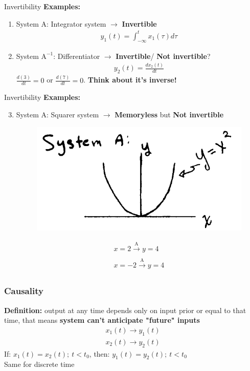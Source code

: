 \documentclass[pdflatex,compress,mathserif]{beamer}
\begin{document}
\begin{frame}{Invertibility}
	\textbf{Examples:}
	\begin{enumerate}
		\item System A: Integrator system $\rightarrow$ \textbf{Invertible}
		\begin{align*}
			y_1(t) = \int_{-\infty}^{t} x_1 (\tau) d\tau
		\end{align*}
		\item System $ \text{A}^{-1} $: Differentiator $\rightarrow$ \textbf{Invertible}/ \textbf{Not invertible}?
		\begin{align*}
			y_2(t) = \frac{dx_2(t)}{dt}
		\end{align*}
		$ \frac{d(3)}{dt} = 0 $ or $ \frac{d(7)}{dt} = 0 $. \textbf{Think about it's inverse!}
	\end{enumerate}
\end{frame}

\begin{frame}{Invertibility}
	\textbf{Examples:}
	\begin{enumerate}
		\setcounter{enumi}{2}
		\item System A: Squarer system $\rightarrow$ \textbf{Memoryless} but \textbf{Not invertible}
		\begin{figure}
			\centering
			\includegraphics[height=0.3\textheight]{img/img01}
		\end{figure}
		\begin{align*}
			x = 2 \xrightarrow[\text{}]{\text{A}} y = 4 \\
			x = -2 \xrightarrow[\text{}]{\text{A}} y = 4
		\end{align*}
	\end{enumerate}
\end{frame}

\begin{frame}
	\frametitle{Causality}
	\textbf{Definition:} output at any time depends only on input prior or equal to that time, that means \textbf{system can't anticipate "future" inputs}
	\begin{align*}
		x_1(t) \longrightarrow y_1(t) \\
		x_2(t) \longrightarrow y_2(t)
	\end{align*}
	If: $ x_1(t) = x_2(t);~t<t_0$, then: $ y_1(t) = y_2(t);~t<t_0 $\\
	Same for discrete time
\end{frame}
\end{document}
